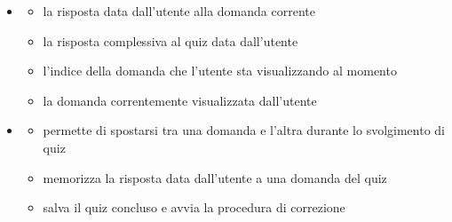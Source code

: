 \begin{itemize}
\item {}
\begin{itemize}
\item {}
\newline
la risposta data dall'utente alla domanda corrente
\item {}
\newline
la risposta complessiva al quiz data dall'utente
\item {}
\newline
l'indice della domanda che l'utente sta visualizzando al momento
\item {}
\newline
la domanda correntemente visualizzata dall'utente
\end{itemize}
\item {}
\begin{itemize}
\item {}
\newline
permette di spostarsi tra una domanda e l'altra durante lo svolgimento di quiz
\newline
\item {}
\newline
memorizza la risposta data dall'utente a una domanda del quiz
\newline
\item {}
\newline
salva il quiz concluso e avvia la procedura di correzione
\newline
\end{itemize}
\end{itemize}
